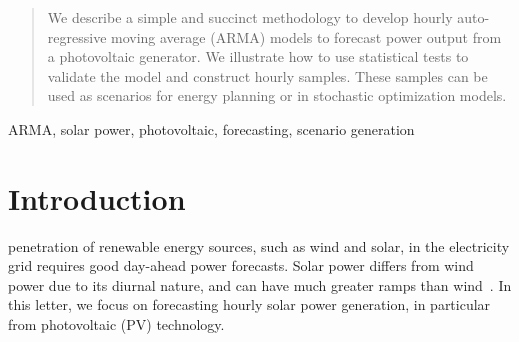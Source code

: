 \documentclass[letter]{IEEEtran}
\begin{document}







\maketitle

\begin{abstract}
We describe a simple and succinct methodology to develop hourly auto-regressive 
moving average (ARMA) models to forecast power output from a photovoltaic 
generator. We illustrate how to use statistical tests to validate the model and 
construct hourly samples. These samples can be used as scenarios for energy 
planning or in stochastic optimization models.
\end{abstract}

\begin{IEEEkeywords}
ARMA, solar power, photovoltaic, forecasting, scenario generation
\end{IEEEkeywords}






%
\IEEEpeerreviewmaketitle



\section{Introduction}
 penetration of renewable energy sources, such as 
wind and solar, in 
the electricity grid requires good day-ahead power forecasts. Solar power 
differs from wind power due to its diurnal nature, and can have much greater 
ramps than wind~\cite{graabak2016variability}. In this letter, we focus 
on forecasting  hourly solar power generation, in particular from photovoltaic 
(PV) technology. 
\end{document}
